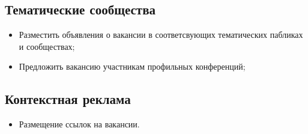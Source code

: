 \documentclass[a4paper,8pt]{article}
\begin{document}
\subsection*{Тематические сообщества}

    \begin{itemize}
        \item Разместить объявления о вакансии в соответсвующих тематических пабликах и сообществах;
        \item Предложить вакансию участникам профильных конференций;
    \end{itemize}

\subsection*{Контекстная реклама}

    \begin{itemize}
        \item Размещение ссылок на вакансии.
    \end{itemize}
\end{document}
